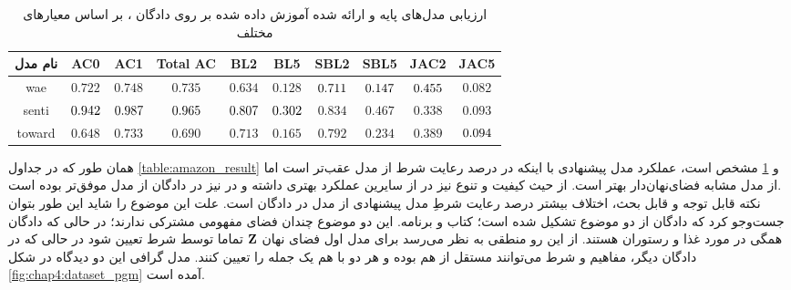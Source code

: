 \begin{table}[!htb]
	\centering
	\caption{
		ارزیابی مدل‌های پایه و ارائه شده آموزش داده شده بر روی دادگان ، بر اساس معیار‌های مختلف}
	\label{table:yelp_result}
	\small\tabcolsep=0.07cm
	\begin{tabular}{||c||c c c|c c|c c|c c||}\hline\hline نام مدل & AC0                        & AC1                        & Total AC                   & BL2                        & BL5                        & SBL2                       & SBL5                       & JAC2                       & JAC5                       \\
		\hline\hline
		wae                                            & $0.722$                    & $0.748$                    & $0.735$                    & $0.634$                    & $0.128$                    & $\cellcolor{gray!25}0.711$ & $\cellcolor{gray!25}0.147$ & $\cellcolor{gray!25}0.455$ & $0.082$                    \\
		\hline
		senti                                          & $\cellcolor{gray!25}0.942$ & $\cellcolor{gray!25}0.987$ & $\cellcolor{gray!25}0.965$ & $\cellcolor{gray!25}0.807$ & $\cellcolor{gray!25}0.302$ & $0.834$                    & $0.467$                    & $0.338$                    & $0.093$                    \\
		\hline
		toward                                         & $0.648$                    & $0.733$                    & $0.690$                    & $0.713$                    & $0.165$                    & $0.792$                    & $0.234$                    & $0.389$                    & $\cellcolor{gray!25}0.094$ \\
		\hline
		\hline\end{tabular}\normalsize
\end{table}
همان طور که در جداول \ref{table:amazon_result} و \ref{table:yelp_result} مشخص است، عملکرد مدل پیشنهادی با اینکه در درصد رعایت شرط از مدل \sentigan{} عقب‌تر است اما از مدل مشابه فضای‌نهان‌دار \towardctg{} بهتر است. از حیث کیفیت و تنوع نیز در \jaccard[-2]{} از سایرین عملکرد بهتری داشته و در \jaccard[-5]{} نیز در دادگان \amazon{} از مدل \towardctg{} موفق‌تر بوده است.
\\
نکته قابل توجه و قابل بحث، اختلاف بیشتر درصد رعایت شرطِ مدل پیشنهادی از مدل \towardctg{} در دادگان \amazon{} است. علت این موضوع را شاید این طور بتوان جست‌وجو کرد که دادگان \amazon{} از دو موضوع تشکیل شده است؛ کتاب و برنامه. این دو موضوع چندان فضای مفهومی مشترکی ندارند؛ در حالی که دادگان \yelp{} همگی در مورد غذا و رستوران هستند. از این رو منطقی به نظر می‌رسد برای مدل اول فضای نهان ${\bf Z}$ تماما توسط شرط تعیین شود در حالی که در دادگان دیگر، مفاهیم و شرط می‌توانند مستقل از هم بوده و هر دو با هم یک جمله را تعیین کنند. مدل گرافی این دو دیدگاه در شکل \ref{fig:chap4:dataset_pgm} آمده است. 
